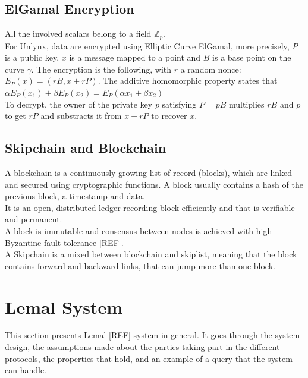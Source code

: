 \documentclass{article}
\begin{document}
\subsection{ElGamal Encryption}
All the involved scalars belong to a field $\mathbb{Z}_p$.\\
For Unlynx, data are encrypted using Elliptic Curve ElGamal, more precisely, $P$ is a public key, $x$ is a message mapped to a point and $B$ is a base point on the curve $\gamma$. The encryption is the following, with $r$ a random nonce:\\
$E_P(x) = (rB,x+rP)$. The additive homomorphic property states that $\alpha E_P(x_1) + \beta E_P(x_2) = E_P(\alpha x_1+ \beta x_2)$\\
To decrypt, the owner of the private key $p$ satisfying $P = pB$ multiplies $rB$ and $p$ to get $rP$ and substracts it from $x + rP$ to recover $x$.\\

\subsection{Skipchain and Blockchain}
A blockchain is a continuously growing list of record (blocks), which are linked and secured using cryptographic functions. A block usually contains a hash of the previous block, a timestamp and data.\\
It is an open, distributed ledger recording block efficiently and that is verifiable and permanent.\\
A block is immutable and consensus between nodes is achieved with high Byzantine fault tolerance [REF].\\
A Skipchain is a mixed between blockchain and skiplist, meaning that the block contains forward and backward links, that can jump more than one block.\\


\section{Lemal System}
This section presents Lemal [REF] system in general. It goes through the system design, the assumptions made about the parties taking part in the different protocols, the properties that hold, and an example of a query that the system can handle.\\
\end{document}
